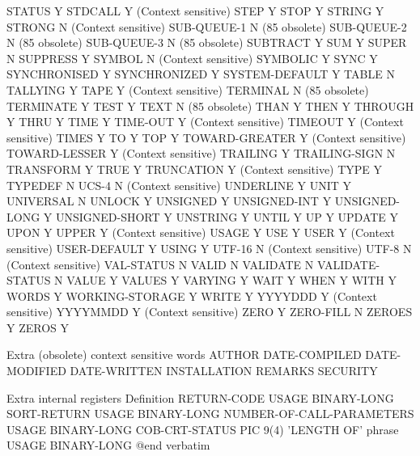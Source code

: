 STATUS				Y
STDCALL				Y (Context sensitive)
STEP				Y
STOP				Y
STRING				Y
STRONG				N (Context sensitive)
SUB-QUEUE-1			N (85 obsolete)
SUB-QUEUE-2			N (85 obsolete)
SUB-QUEUE-3			N (85 obsolete)
SUBTRACT			Y
SUM				Y
SUPER				N
SUPPRESS			Y
SYMBOL				N (Context sensitive)
SYMBOLIC			Y
SYNC				Y
SYNCHRONISED			Y
SYNCHRONIZED			Y
SYSTEM-DEFAULT			Y
TABLE				N
TALLYING			Y
TAPE				Y (Context sensitive)
TERMINAL			N (85 obsolete)
TERMINATE			Y
TEST				Y
TEXT				N (85 obsolete)
THAN				Y
THEN				Y
THROUGH				Y
THRU				Y
TIME				Y
TIME-OUT			Y (Context sensitive)
TIMEOUT				Y (Context sensitive)
TIMES				Y
TO				Y
TOP				Y
TOWARD-GREATER			Y (Context sensitive)
TOWARD-LESSER			Y (Context sensitive)
TRAILING			Y
TRAILING-SIGN			N
TRANSFORM			Y
TRUE				Y
TRUNCATION			Y (Context sensitive)
TYPE				Y
TYPEDEF				N
UCS-4				N (Context sensitive)
UNDERLINE			Y
UNIT				Y
UNIVERSAL			N
UNLOCK				Y
UNSIGNED			Y
UNSIGNED-INT			Y
UNSIGNED-LONG			Y
UNSIGNED-SHORT			Y
UNSTRING			Y
UNTIL				Y
UP				Y
UPDATE				Y
UPON				Y
UPPER				Y (Context sensitive)
USAGE				Y
USE				Y
USER				Y (Context sensitive)
USER-DEFAULT			Y
USING				Y
UTF-16				N (Context sensitive)
UTF-8				N (Context sensitive)
VAL-STATUS			N
VALID				N
VALIDATE			N
VALIDATE-STATUS			N
VALUE				Y
VALUES				Y
VARYING				Y
WAIT				Y
WHEN				Y
WITH				Y
WORDS				Y
WORKING-STORAGE			Y
WRITE				Y
YYYYDDD				Y (Context sensitive)
YYYYMMDD			Y (Context sensitive)
ZERO				Y
ZERO-FILL			N
ZEROES				Y
ZEROS				Y

Extra (obsolete) context sensitive words
AUTHOR
DATE-COMPILED
DATE-MODIFIED
DATE-WRITTEN
INSTALLATION
REMARKS
SECURITY

Extra internal registers	Definition
RETURN-CODE			USAGE BINARY-LONG
SORT-RETURN			USAGE BINARY-LONG
NUMBER-OF-CALL-PARAMETERS	USAGE BINARY-LONG
COB-CRT-STATUS			PIC 9(4)
'LENGTH OF' phrase		USAGE BINARY-LONG
@end verbatim

